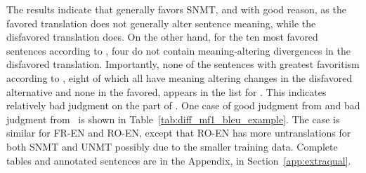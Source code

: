 The results indicate that  generally favors SNMT, and with good reason, as the favored translation does not generally alter sentence meaning, while the disfavored translation does. On the other hand, for the ten most favored sentences according to \bleu, four do not contain meaning-altering divergences in the disfavored translation. Importantly, none of the sentences with greatest favoritism according to , eight of which all have meaning altering changes in the disfavored alternative and none in the favored, appears in the list for \bleu. This indicates relatively bad judgment on the part of \bleu. One case of good judgment from  and bad judgment from \bleu\ is shown in Table~\ref{tab:diff_mf1_bleu_example}. The case is similar for FR-EN and RO-EN, except that RO-EN has more untranslations for both SNMT and UNMT possibly due to the smaller training data. Complete tables and annotated sentences are in the Appendix, in Section~\ref{app:extraqual}.







